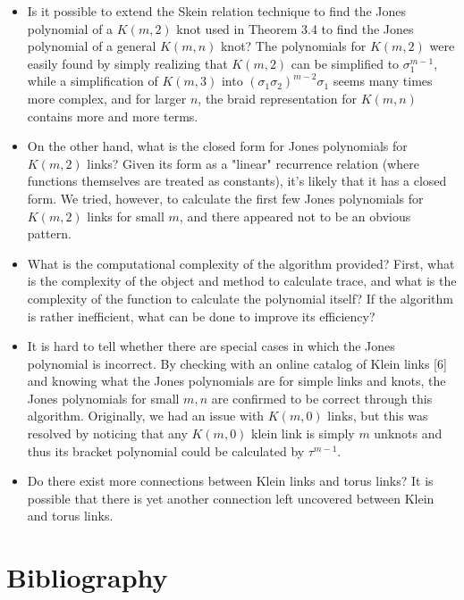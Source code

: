 \documentclass[12pt]{article}
\begin{document}
\begin{itemize}

\item Is it possible to extend the Skein relation technique to find the Jones polynomial of a $K(m, 2)$ knot used in Theorem 3.4 to find the Jones polynomial of a general $K(m, n)$ knot? The polynomials for $K(m, 2)$ were easily found by simply realizing that $K(m, 2)$ can be simplified to $\sigma_1^{m - 1}$, while a simplification of $K(m, 3)$ into $(\sigma_1 \sigma_2)^{m - 2} \sigma_1$ seems many times more complex, and for larger $n$, the braid representation for $K(m, n)$ contains more and more terms. 

\item On the other hand, what is the closed form for Jones polynomials for $K(m, 2)$ links? Given its form as a "linear" recurrence relation (where functions themselves are treated as constants), it's likely that it has a closed form. We tried, however, to calculate the first few Jones polynomials for $K(m, 2)$ links for small $m$, and there appeared not to be an obvious pattern. 

\item What is the computational complexity of the algorithm provided? First, what is the complexity of the object and method to calculate trace, and what is the complexity of the function to calculate the polynomial itself? If the algorithm is rather inefficient, what can be done to improve its efficiency? 

\item It is hard to tell whether there are special cases in which the Jones polynomial is incorrect. By checking with an online catalog of Klein links [6] and knowing what the Jones polynomials are for simple links and knots, the Jones polynomials for small $m, n$ are confirmed to be correct through this algorithm. Originally, we had an issue with $K(m, 0)$ links, but this was resolved by noticing that any $K(m, 0)$ klein link is simply $m$ unknots and thus its bracket polynomial could be calculated by $\tau^{m - 1}$. 

\item Do there exist more connections between Klein links and torus links? It is possible that there is yet another connection left uncovered between Klein and torus links. 

\end{itemize}


\clearpage


\section{Bibliography}
\end{document}
